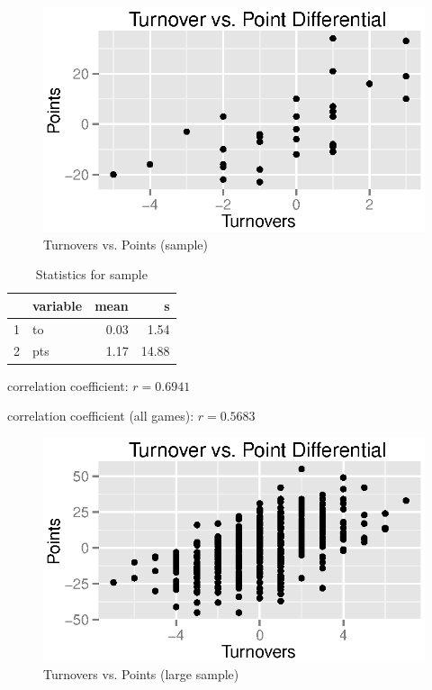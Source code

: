 \documentclass{exam}
\begin{document}
  \begin{figure}[H]
    \centering
    \includegraphics{figures/nfl/to_vs_pts.eps}
    \caption{Turnovers vs. Points (sample)}
  \end{figure}

  \begin{table}[H]
    \centering
    \begin{tabular}{rlrr}
      \toprule
         & variable & mean & s \\
      \midrule
      1  & to       & 0.03 & 1.54 \\
      2  & pts      & 1.17 & 14.88 \\
      \bottomrule
    \end{tabular}
    \caption{Statistics for sample}
  \end{table}

  \begin{itemize*}
    \item correlation coefficient: $r = 0.6941$
    \item correlation coefficient (all games): $r = 0.5683$
  \end{itemize*}

  \begin{figure}[H]
    \centering
    \includegraphics{figures/nfl/to_vs_pts_all.eps}
    \caption{Turnovers vs. Points (large sample)}
  \end{figure}
\end{document}
